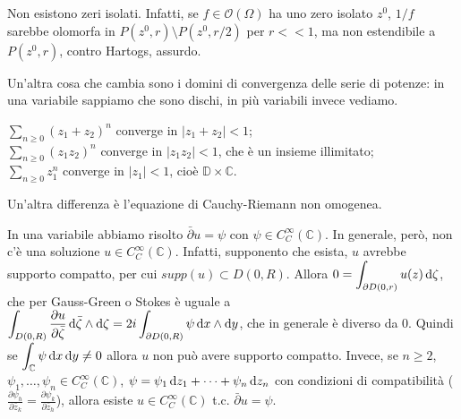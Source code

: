 \begin{ex}
  Non esistono zeri isolati. Infatti, se $f \in \mathcal{O}(\Omega)$ ha uno zero isolato $z^0$, $1/f$ sarebbe olomorfa in $P(z^0,r) \setminus P(z^0, r/2)$ per $r<<1$, ma non estendibile a $P(z^0, r)$, contro Hartogs, assurdo.
\end{ex}

Un'altra cosa che cambia sono i domini di convergenza delle serie di potenze: in una variabile sappiamo che sono dischi, in più variabili invece vediamo.

\begin{ex}
  $\displaystyle \sum_{n \ge 0} (z_1+z_2)^n$ converge in $|z_1+z_2|<1$; \\
  $\displaystyle \sum_{n \ge 0} (z_1z_2)^n$ converge in $|z_1z_2|<1$, che è un insieme illimitato; \\
  $\displaystyle \sum_{n \ge 0} z_1^n$ converge in $|z_1|<1$, cioè $\mathbb{D}\times \mathbb{C}$.
\end{ex}

Un'altra differenza è l'equazione di Cauchy-Riemann non omogenea.

\begin{ex}
  In una variabile abbiamo risolto $\bar{\partial}u=\psi$ con $\psi \in C^\infty_C(\mathbb{C})$. In generale, però, non c'è una soluzione $u \in C^\infty_C(\mathbb{C})$. Infatti, supponento che esista, $u$ avrebbe supporto compatto, per cui $supp(u) \subset D(0,R)$.
  Allora $\displaystyle 0=\int_{\partial D(0,r)} u(z)\mathop{}\!\mathrm{d} \zeta$, che per Gauss-Green o Stokes è uguale a $\displaystyle \int_{D(0,R)} \dfrac{\partial u}{\partial \bar{\zeta}} \mathop{}\!\mathrm{d}\bar{\zeta}\wedge\mathop{}\!\mathrm{d}\zeta=2i\int_{\partial D(0,R)} \psi \mathop{}\!\mathrm{d} x\wedge\mathop{}\!\mathrm{d} y$, che in generale è diverso da $0$. Quindi se $\displaystyle \int_{\mathbb{C}} \psi \mathop{}\!\mathrm{d} x \mathop{}\!\mathrm{d} y\not=0$ allora $u$ non può avere supporto compatto.
  Invece, se $n \ge 2$, $\psi_1, \dots, \psi_n \in C^\infty_C(\mathbb{C})$, $\psi=\psi_1\mathop{}\!\mathrm{d} z_1+\dots+\psi_n\mathop{}\!\mathrm{d} z_n$ con condizioni di compatibilità ($\frac{\partial \psi_h}{\partial \bar{z}_k}=\frac{\partial \psi_k}{\partial \bar{z}_h}$), allora esiste $u \in C^\infty_C(\mathbb{C})$ t.c. $\bar{\partial}u=\psi$.
\end{ex}
